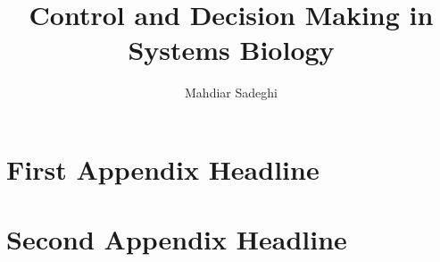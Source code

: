 \documentclass[PHD]{macro/neu}
\title{Control and Decision Making in Systems Biology}
\author{Mahdiar Sadeghi}
\begin{document}
\titlepage

\begin{frontmatter}



\tableofcontents
\listoffigures
\newpage\ssp
\listoftables




\end{frontmatter}
\pagestyle{headings}







\printbibliography

\appendix
\chapter{First Appendix Headline}
\chapter{Second Appendix Headline}
\printindex
\end{document}
